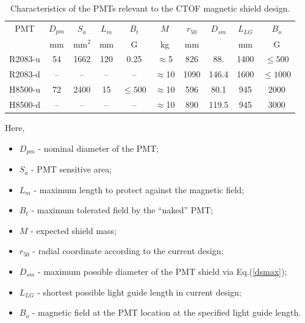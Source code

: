 \begin{table}[htbp]
\begin{center}
\begin{tabular}{|c|c|c|c|c|c|c|c|c|c|}  \hline 
PMT     & $D_{pm}$ & $S_a$  & $L_{m}$ & $B_{t}$  & $M$         & $r_{50}$ & $D_{sm}$ & $L_{LG}$ & $B_{o}$   \\
        & mm       & mm$^2$ &  mm     & G        & kg          & mm      &          &  mm       & G         \\ \hline
R2083-u & 54       & 1662   & 120     & 0.25     & $\approx$5  & 826     &  88.     & 1400      & $\le500$  \\ \hline
R2083-d & --       &  --    & --      & --       & $\approx$10 & 1090    & 146.4    & 1600      & $\le1000$ \\ \hline
H8500-u & 72       & 2400   & 15      & $\le500$ & $\approx$10 &  596    &  80.1    & 945       & 2000      \\ \hline 
H8500-d & --       &  --    & --      &  --      & $\approx$10 & 890     & 119.5    & 945       & 3000      \\ \hline
\end{tabular}
\end{center}
\caption{\small{Characteristics of the PMTs relevant to the CTOF magnetic
shield design.}}
\label{PMT_char}
\end{table}

\noindent
Here,

\begin{itemize} 
\item $D_{pm}$ - nominal diameter of the PMT; 
\item $S_a$    - PMT sensitive area;
\item $L_{m}$  - maximum length to protect against the magnetic field;
\item $B_{t}$  - maximum tolerated field by the ``naked'' PMT;
\item $M$      - expected shield mass; 
\item $r_{50}$ - radial coordinate according to the current design;
\item $D_{sm}$ - maximum possible diameter of the PMT shield via Eq.(\ref{dsmax});
\item $L_{LG}$ - shortest possible light guide length in current design;
\item $B_{o}$  - magnetic field at the PMT location at the specified light guide length.
\end{itemize}

